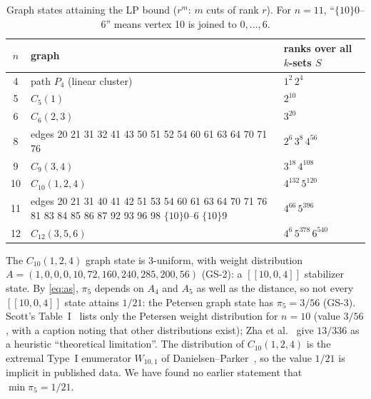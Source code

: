 \begin{table}[htbp]
\centering
\begin{tabular}{@{}c>{\raggedright\arraybackslash}p{8cm}l@{}}
\toprule
$n$ & graph & ranks over all $k$-sets $S$\\
\midrule
4 & path $P_4$ (linear cluster) & $1^{2}\,2^{4}$ \\
5 & $C_5(1)$ & $2^{10}$ \\
6 & $C_6(2,3)$ & $3^{20}$ \\
8 & edges 20 21 31 32 41 43 50 51 52 54 60 61 63 64 70 71 76 & $2^6\,3^8\,4^{56}$ \\
9 & $C_9(3,4)$ & $3^{18}\,4^{108}$ \\
10 & $C_{10}(1,2,4)$ & $4^{132}\,5^{120}$ \\
11 & edges 20 21 31 40 41 42 51 53 54 60 61 63 64 70 71 76 81 83 84 85 86 87 92 93 96 98 $\{10\}$0--6 $\{10\}$9 & $4^{66}\,5^{396}$\\
12 & $C_{12}(3,5,6)$ & $4^{6}\,5^{378}\,6^{540}$ \\
\bottomrule
\end{tabular}
\caption{Graph states attaining the LP bound ($r^m$: $m$ cuts of rank $r$). For $n=11$,
``$\{10\}$0--6'' means vertex 10 is joined to $0,\dots,6$.}
\label{tab:graphs}
\end{table}

\begin{remark}\label{rem:ten}
The $C_{10}(1,2,4)$ graph state is $3$-uniform, with weight distribution
$A=(1,0,0,0,10,72,160,240,285,200,56)$ (GS-2): a $[[10,0,4]]$ stabilizer state. By \eqref{eq:as},
$\pi_5$ depends on $A_4$ and $A_5$ as well as the distance, so not every $[[10,0,4]]$ state attains
$1/21$: the Petersen graph state has $\pi_5=3/56$ (GS-3). Scott's Table~I~\cite{Scott} lists only
the Petersen weight distribution for $n=10$ (value $3/56$, with a caption noting that other
distributions exist); Zha et al.~\cite{Zha14} give $13/336$ as a heuristic ``theoretical
limitation''. The distribution of $C_{10}(1,2,4)$ is the extremal Type~I enumerator $W_{10,1}$ of
Danielsen--Parker~\cite{DP}, so the value $1/21$ is implicit in published data. We have found no earlier
statement that $\min\pi_5=1/21$.
\end{remark}

